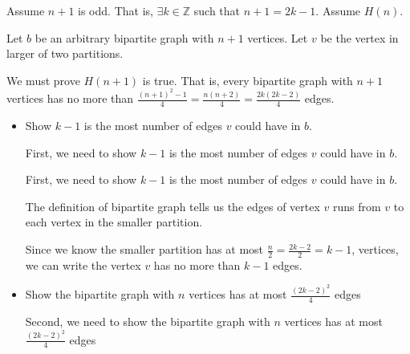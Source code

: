 \documentclass[12pt]{article}
\begin{document}
\begin{enumerate}[a.]
\begin{mdframed}
\begin{enumerate}[1.]
\begin{enumerate}[1.]
                \bigskip

                Assume $n+1$ is odd. That is, $\exists k \in \mathbb{Z}$ such that
                $n+1 = 2k-1$. Assume $H(n)$.

                \bigskip

                Let $b$ be an arbitrary bipartite graph with $n+1$ vertices. Let
                $v$ be the vertex in larger of two partitions.

                \bigskip

                We must prove $H(n+1)$ is true. That is, every bipartite graph
                with $n+1$ vertices has no more than $\frac{(n+1)^2-1}{4} = \frac{n(n+2)}{4} = \frac{2k(2k-2)}{4}$
                edges.

                \bigskip

                \begin{itemize}
                    \item Show $k-1$ is the most number of edges $v$ could have
                    in $b$.

                    First, we need to show $k-1$ is the most number of edges $v$
                    could have in $b$.

                    \begin{mdframed}
                    First, we need to show $k-1$ is the most number of edges $v$
                    could have in $b$.

                    \bigskip

                    The definition of bipartite graph tells us the edges of vertex
                    $v$ runs from $v$ to each vertex in the smaller partition.

                    \bigskip

                    Since we know the smaller partition has at most $\frac{n}{2} = \frac{2k-2}{2} = k - 1$,
                    vertices, we can write the vertex $v$ has no more than $k-1$ edges.

                    \end{mdframed}

                    \item Show the bipartite graph with $n$ vertices has
                    at most $\frac{(2k-2)^2}{4}$ edges

                    \begin{mdframed}
                    Second, we need to show the bipartite graph with $n$ vertices has
                    at most $\frac{(2k-2)^2}{4}$ edges


\end{mdframed}
\end{itemize}
\end{enumerate}
\end{enumerate}
\end{mdframed}
\end{enumerate}
\end{document}

